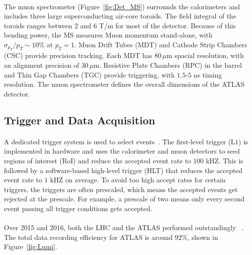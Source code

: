 \paragraph{}
The muon spectrometer (Figure~\ref{fig:Det_MS}) surrounds the calorimeters and includes three large superconducting air-core toroids. 
The field integral of the toroids ranges between 2 and 6 T/m for most of the detector. Because of this bending power, the MS measures Muon momentum stand-alone, with $\sigma_{p_{T}}/p_{T} \sim 10\%$ at $p_{T} = 1$\TeV. 
Muon Drift Tubes (MDT) and Cathode Strip Chambers (CSC) provide precision tracking. 
Each MDT has $80\,\mu\textrm{m}$ spacial resolution, with an alignment precision of $30\,\mu\textrm{m}$.
Resistive Plate Chambers (RPC) in the barrel and Thin Gap Chambers (TGC) provide triggering, with $1.5$-$5$ ns timing resolution.  The muon spectrometer defines the overall dimensions of the ATLAS
detector.

\subsection{Trigger and Data Acquisition}
\paragraph{}
A dedicated trigger system is used to select events~\cite{ATLAS-TRIGGER}.
The first-level trigger (L$1$) is implemented in hardware and uses the calorimeter and muon detectors to seed regions of interest (RoI) and reduce the accepted event rate to $100$ kHZ.
This is followed by a software-based high-level trigger (HLT) that reduces the accepted event rate to $1$ kHZ on average. 
To avoid too high accept rates for certain triggers, the triggers are often prescaled, which means the accepted events get rejected at the prescale. For example, a prescale of two means only every second event passing all trigger conditions gets accepted. 

\paragraph{}
Over 2015 and 2016, both the LHC and the ATLAS performed outstandingly ~\cite{Lumi_Run2}. The total data recording efficiency for ATLAS is around $92\%$, shown in Figure~\ref{fig:Lumi}.

